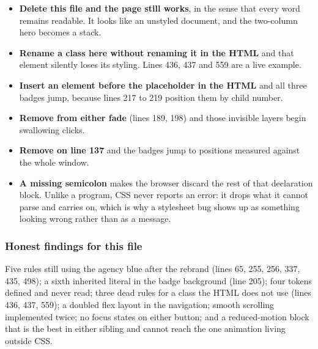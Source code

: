 \begin{itemize}
\item \textbf{Delete this file and the page still works}, in the sense that every
  word remains readable. It looks like an unstyled document, and the two-column
  hero becomes a stack.
\item \textbf{Rename a class here without renaming it in the HTML} and that element
  silently loses its styling. Lines 436, 437 and 559 are a live example.
\item \textbf{Insert an element before the placeholder in the HTML} and all three
  badges jump, because lines 217 to 219 position them by child number.
\item \textbf{Remove  from either fade} (lines 189, 198)
  and those invisible layers begin swallowing clicks.
\item \textbf{Remove  on line 137} and the badges jump to
  positions measured against the whole window.
\item \textbf{A missing semicolon} makes the browser discard the rest of that
  declaration block. Unlike a program, CSS never reports an error: it drops what it
  cannot parse and carries on, which is why a stylesheet bug shows up as something
  looking wrong rather than as a message.
\end{itemize}

\subsubsection*{Honest findings for this file}

Five rules still using the agency blue after the rebrand (lines 65, 255, 256, 337,
435, 498); a sixth inherited literal in the badge background (line 205); four
tokens defined and never read; three dead rules for a class the HTML does not use
(lines 436, 437, 559); a doubled flex layout in the navigation; smooth scrolling
implemented twice; no focus states on either button; and a reduced-motion block
that is the best in either sibling and cannot reach the one animation living
outside CSS.
